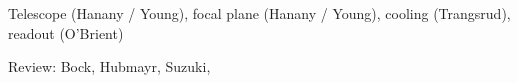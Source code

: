 \documentclass[PICOAPC.tex]{subfiles}
\begin{document}
Telescope (Hanany / Young), focal plane (Hanany / Young), cooling (Trangsrud), readout (O'Brient) 

Review: Bock, Hubmayr, Suzuki, 
\end{document}
